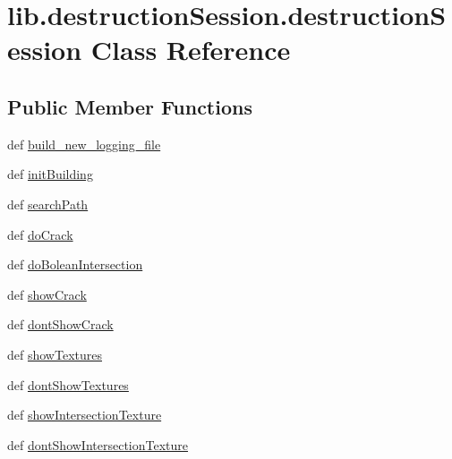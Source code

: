 \hypertarget{classlib_1_1destruction_session_1_1destruction_session}{\section{lib.\-destruction\-Session.\-destruction\-Session Class Reference}
\label{classlib_1_1destruction_session_1_1destruction_session}
}
\subsection*{Public Member Functions}
\begin{DoxyCompactItemize}
\item 
def \hyperlink{classlib_1_1destruction_session_1_1destruction_session_acc0980a0d1d85453eb1842d2854d192a}{build\-\_\-new\-\_\-logging\-\_\-file}
\item 
def \hyperlink{classlib_1_1destruction_session_1_1destruction_session_af0e23cd8d052d995d0ffe15f112feae3}{init\-Building}
\item 
def \hyperlink{classlib_1_1destruction_session_1_1destruction_session_aa3f1680372617c35f4a47a41239c8893}{search\-Path}
\item 
def \hyperlink{classlib_1_1destruction_session_1_1destruction_session_a14d4356190289fba47447b666b610bda}{do\-Crack}
\item 
def \hyperlink{classlib_1_1destruction_session_1_1destruction_session_a2d7bdfbbb8f2facdd16fe476ed8ad417}{do\-Bolean\-Intersection}
\item 
def \hyperlink{classlib_1_1destruction_session_1_1destruction_session_a16837d2b0b25facb50381fb7c06cd700}{show\-Crack}
\item 
def \hyperlink{classlib_1_1destruction_session_1_1destruction_session_a7d26818113dcf06b253e0be9cf91f108}{dont\-Show\-Crack}
\item 
def \hyperlink{classlib_1_1destruction_session_1_1destruction_session_af0c0970bf6a507def85f16b840e1cfa4}{show\-Textures}
\item 
def \hyperlink{classlib_1_1destruction_session_1_1destruction_session_a0e359a799a05711af3f18129c616a7f2}{dont\-Show\-Textures}
\item 
def \hyperlink{classlib_1_1destruction_session_1_1destruction_session_a846db52f41e4c1c72a20b5ed941bb345}{show\-Intersection\-Texture}
\item 
def \hyperlink{classlib_1_1destruction_session_1_1destruction_session_a5767469d3c8869fe01018e0c4354bc3c}{dont\-Show\-Intersection\-Texture}

\end{DoxyCompactItemize}
